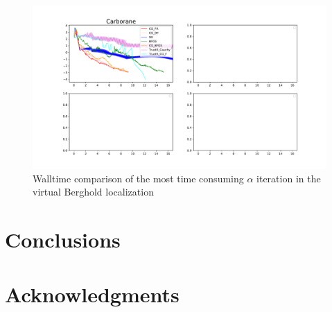 \documentclass[aps,prl,reprint,amsmath,amssymb]{revtex4-1}
\begin{document}
\begin{figure}[htb]
\centering
\includegraphics[width=\textwidth]{virtual_walltime.pdf}
\caption{Walltime comparison of the most time consuming $\alpha$ iteration in the virtual Berghold localization}
\label{fig:vir_walltime}
\end{figure}


\section{Conclusions}


\section{Acknowledgments} 


%

\end{document}

